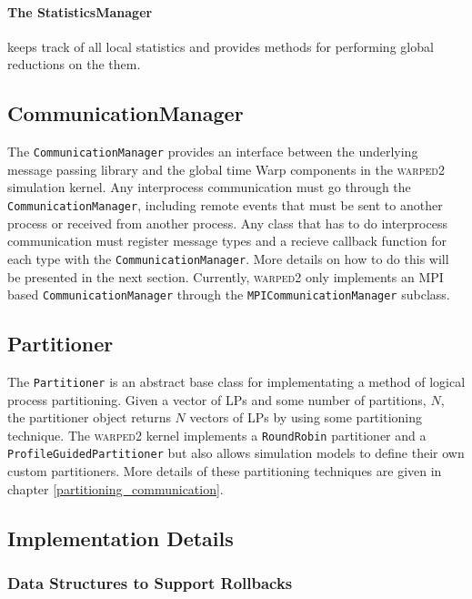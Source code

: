 \documentclass[11pt]{book}
\begin{document}
\paragraph{The StatisticsManager} keeps track of all local statistics and provides methods for
performing global reductions on the them.  

\subsection{CommunicationManager}

The \texttt{CommunicationManager} provides an interface between the underlying message passing library
and the global time Warp components in the \textsc{warped2} simulation kernel.  Any interprocess
communication must go through the \texttt{CommunicationManager}, including remote events that must be
sent to another process or received from another process.  Any class that has to do interprocess
communication must register message types and a recieve callback function for each type with
the \texttt{CommunicationManager}. More details on how to do this will be presented in the
next section. Currently, \textsc{warped2} only implements an MPI based \texttt{CommunicationManager}
through the \texttt{MPICommunicationManager} subclass.

\subsection{Partitioner}

The \texttt{Partitioner} is an abstract base class for implementating a method of logical
process partitioning.  Given a vector of LPs and some number of partitions, $N$, the partitioner
object returns $N$ vectors of LPs by using some partitioning technique.  The \textsc{warped2} kernel
implements a \texttt{RoundRobin} partitioner and a \texttt{ProfileGuidedPartitioner} but also
allows simulation models to define their own custom partitioners.  More details of these
partitioning techniques are given in chapter \ref{partitioning_communication}.

\subsection{Implementation Details}

\subsubsection[Rollbacks \& Cancellation]{Data Structures to Support Rollbacks}
\end{document}
